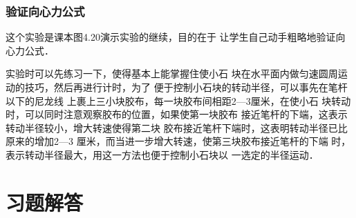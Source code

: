 \subsubsection{验证向心力公式}
这个实验是课本图4.20演示实验的继续，目的在于
让学生自己动手粗略地验证向心力公式．

实验时可以先练习一下，使得基本上能掌握住使小石
块在水平面内做匀速圆周运动的技巧，然后再进行计时，为了
便于控制小石块的转动半径，可以事先在笔杆以下的尼龙线
上裹上三小块胶布，每一块胶布间相距2—3厘米，在使小石
块转动时，可以同时注意观察胶布的位置，如果使第一块胶布
接近笔杆的下端，这表示转动半径较小，增大转速使得第二块
胶布接近笔杆下端时，这表明转动半径已比原来的增加2—3
厘米，而当进一步增大转速，使第三块胶布接近笔杆的下端
时，表示转动半径最大，用这一方法也便于控制小石块以
一选定的半径运动．

\section{习题解答}


